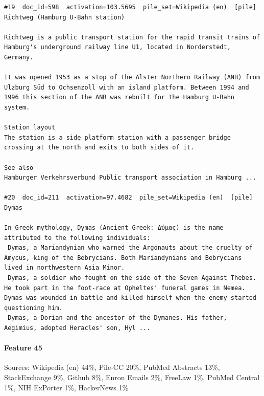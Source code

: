 \begin{verbatim}
#19  doc_id=598  activation=103.5695  pile_set=Wikipedia (en)  [pile]
Richtweg (Hamburg U-Bahn station)

Richtweg is a public transport station for the rapid transit trains of Hamburg's underground railway line U1, located in Norderstedt, Germany.

It was opened 1953 as a stop of the Alster Northern Railway (ANB) from Ulzburg Süd to Ochsenzoll with an island platform. Between 1994 and 1996 this section of the ANB was rebuilt for the Hamburg U-Bahn system.

Station layout 
The station is a side platform station with a passenger bridge crossing at the north and exits to both sides of it.

See also 
Hamburger Verkehrsverbund Public transport association in Hamburg ...

#20  doc_id=211  activation=97.4682  pile_set=Wikipedia (en)  [pile]
Dymas

In Greek mythology, Dymas (Ancient Greek: Δύμας) is the name attributed to the following individuals:
 Dymas, a Mariandynian who warned the Argonauts about the cruelty of Amycus, king of the Bebrycians. Both Mariandynians and Bebrycians lived in northwestern Asia Minor.
 Dymas, a soldier who fought on the side of the Seven Against Thebes. He took part in the foot-race at Opheltes' funeral games in Nemea. Dymas was wounded in battle and killed himself when the enemy started questioning him.
 Dymas, a Dorian and the ancestor of the Dymanes. His father, Aegimius, adopted Heracles' son, Hyl ...

\end{verbatim}

\paragraph*{Feature 45} Sources: Wikipedia (en) 44\%, Pile-CC 20\%, PubMed Abstracts 13\%, StackExchange 9\%, Github 8\%, Enron Emails 2\%, FreeLaw 1\%, PubMed Central 1\%, NIH ExPorter 1\%, HackerNews 1\%

